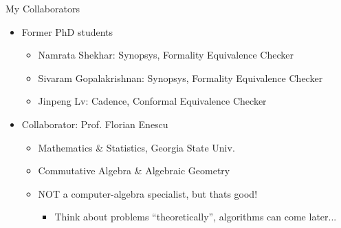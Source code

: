 \documentclass[xcolor=dvipsnames]{beamer}
\begin{document}
\begin{frame}{\large{My Collaborators}}

\begin{itemize}
\item Former PhD students
	\begin{itemize}
	\item Namrata Shekhar: Synopsys, Formality Equivalence Checker
        \item Sivaram Gopalakrishnan: Synopsys, Formality Equivalence Checker
        \item Jinpeng Lv: Cadence, Conformal Equivalence Checker
	\end{itemize}
\item Collaborator: Prof. Florian Enescu
	\begin{itemize}
	\item Mathematics \& Statistics, Georgia State Univ.
        \item Commutative Algebra \& Algebraic Geometry
        \item NOT a computer-algebra specialist, but thats good!
          \begin{itemize}
            \item Think about problems ``theoretically'', algorithms
              can come later...
          \end{itemize}
	\end{itemize}
\end{itemize}
\end{frame}



\end{document}
